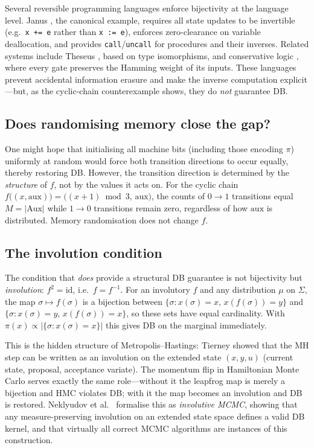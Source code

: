 \documentclass[11pt,a4paper]{article}
\begin{document}
Several reversible programming languages enforce bijectivity at the language level.  Janus
\cite{lutz1982, yokoyama2007}, the canonical example, requires all state updates to be
invertible (e.g.\ \texttt{x += e} rather than \texttt{x := e}), enforces zero-clearance on
variable deallocation, and provides \texttt{call}/\texttt{uncall} for procedures and their
inverses.  Related systems include Theseus \cite{james2014}, based on type isomorphisms, and
conservative logic \cite{fredkin1982}, where every gate preserves the Hamming weight of its
inputs.  These languages prevent accidental information erasure and make the inverse computation
explicit---but, as the cyclic-chain counterexample shows, they do \emph{not} guarantee DB.

\subsection*{Does randomising memory close the gap?}

One might hope that initialising all machine bits (including those encoding $\pi$) uniformly at
random would force both transition directions to occur equally, thereby restoring DB.  However,
the transition direction is determined by the \emph{structure} of $f$, not by the values it acts
on.  For the cyclic chain $f\bigl((x,\mathrm{aux})\bigr)=\bigl((x+1)\bmod 3,\,\mathrm{aux}\bigr)$,
the counts of $0\!\to\!1$ transitions equal $M = |\mathrm{Aux}|$ while $1\!\to\!0$ transitions
remain zero, regardless of how $\mathrm{aux}$ is distributed.  Memory randomisation does not
change $f$.

\subsection*{The involution condition}

The condition that \emph{does} provide a structural DB guarantee is not bijectivity but
\emph{involution}: $f^2 = \mathrm{id}$, i.e.\ $f = f^{-1}$.  For an involutory $f$ and any
distribution $\mu$ on $\Sigma$, the map $\sigma\mapsto f(\sigma)$ is a bijection between
$\{\sigma : x(\sigma)=x,\,x(f(\sigma))=y\}$ and $\{\sigma : x(\sigma)=y,\,x(f(\sigma))=x\}$,
so these sets have equal cardinality.  With $\pi(x)\propto|\{\sigma:x(\sigma)=x\}|$ this gives
DB on the marginal immediately.

This is the hidden structure of Metropolis--Hastings: Tierney \cite{tierney1998} showed that the
MH step can be written as an involution on the extended state $(x,y,u)$ (current state, proposal,
acceptance variate).  The momentum flip in Hamiltonian Monte Carlo \cite{duane1987} serves
exactly the same role---without it the leapfrog map is merely a bijection and HMC violates DB;
with it the map becomes an involution and DB is restored.
Neklyudov et al.\ \cite{neklyudov2020} formalise this as \emph{involutive MCMC}, showing that any
measure-preserving involution on an extended state space defines a valid DB kernel, and that
virtually all correct MCMC algorithms are instances of this construction.
\end{document}
